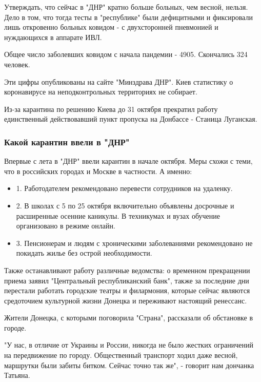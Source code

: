 Утверждать, что сейчас в "ДНР" кратно больше больных, чем весной, нельзя. Дело
в том, что тогда тесты в "республике" были дефицитными и фиксировали лишь
откровенно больных ковидом - с двухсторонней пневмонией и нуждающихся в
аппарате ИВЛ. 

Общее число заболевших ковидом с начала пандемии - 4905. Скончались 324
человек.

Эти цифры опубликованы на сайте "Минздрава ДНР". Киев статистику о коронавирусе
на неподконтрольных территориях не собирает. 

Из-за карантина по решению Киева до 31 октября прекратил работу единственный
действовавший пункт пропуска на Донбассе - Станица Луганская.

\subsubsection{Какой карантин ввели в "ДНР" }

Впервые с лета в "ДНР" ввели карантин в начале октября. Меры схожи с теми, что
в российских городах и Москве в частности. А именно: 

\begin{itemize}
\item 1. Работодателем рекомендовано перевести сотрудников на удаленку. 

\item 2. В школах с 5 по 25 октября включительно объявлены досрочные и
расширенные осенние каникулы. В техникумах и вузах обучение
организовано в режиме онлайн. 

\item 3. Пенсионерам и людям с хроническими заболеваниями рекомендовано не
				покидать жилье без острой необходимости. 
\end{itemize}

Также останавливают работу различные ведомства: о временном прекращении приема
заявил "Центральный республиканский банк", также за последние дни перестали
работать городские театры и филармония, которые сейчас являются средоточием
культурной жизни Донецка и переживают настоящий ренессанс. 

Жители Донецка, с которыми поговорила "Страна", рассказали об обстановке в
городе.

"У нас, в отличие от Украины и России, никогда не было жестких ограничений на
передвижение по городу. Общественный транспорт ходил даже весной, маршрутки
были забиты битком. Сейчас точно так же", - говорит нам дончанка Татьяна. 

